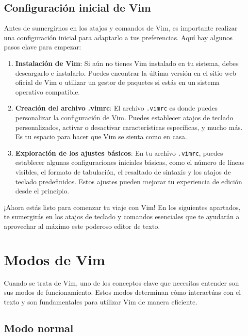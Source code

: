 \documentclass[
  a4paper,
]{article}
\begin{document}
\subsection{Configuración inicial de
Vim}\label{configuraciuxf3n-inicial-de-vim}

Antes de sumergirnos en los atajos y comandos de Vim, es importante
realizar una configuración inicial para adaptarlo a tus preferencias.
Aquí hay algunos pasos clave para empezar:

\begin{enumerate}
\def\labelenumi{\arabic{enumi}.}
\item
  \textbf{Instalación de Vim}: Si aún no tienes Vim instalado en tu
  sistema, debes descargarlo e instalarlo. Puedes encontrar la última
  versión en el sitio web oficial de Vim o utilizar un gestor de
  paquetes si estás en un sistema operativo compatible.
\item
  \textbf{Creación del archivo .vimrc}: El archivo \texttt{.vimrc} es
  donde puedes personalizar la configuración de Vim. Puedes establecer
  atajos de teclado personalizados, activar o desactivar características
  específicas, y mucho más. Es tu espacio para hacer que Vim se sienta
  como en casa.
\item
  \textbf{Exploración de los ajustes básicos}: En tu archivo
  \texttt{.vimrc}, puedes establecer algunas configuraciones iniciales
  básicas, como el número de líneas visibles, el formato de tabulación,
  el resaltado de sintaxis y los atajos de teclado predefinidos. Estos
  ajustes pueden mejorar tu experiencia de edición desde el principio.
\end{enumerate}

¡Ahora estás listo para comenzar tu viaje con Vim! En los siguientes
apartados, te sumergirás en los atajos de teclado y comandos esenciales
que te ayudarán a aprovechar al máximo este poderoso editor de texto.

\section{Modos de Vim}\label{modos-de-vim}

Cuando se trata de Vim, uno de los conceptos clave que necesitas
entender son sus modos de funcionamiento. Estos modos determinan cómo
interactúas con el texto y son fundamentales para utilizar Vim de manera
eficiente.

\subsection{Modo normal}\label{modo-normal}
\end{document}
